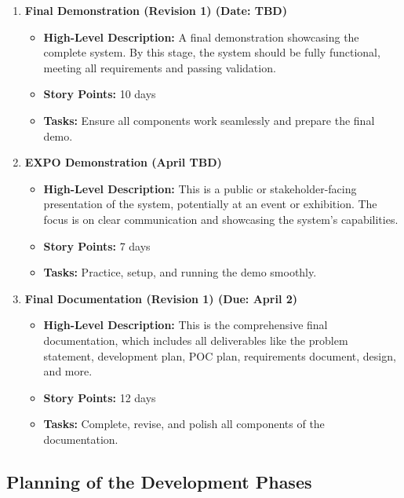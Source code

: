 \documentclass[12pt]{article}
\begin{document}
\begin{enumerate}
    \item \textbf{Final Demonstration (Revision 1) (Date: TBD)}
    \begin{itemize}
        \item \textbf{High-Level Description:} A final demonstration showcasing the complete system. By this stage, the system should be fully functional, meeting all requirements and passing validation.
        \item \textbf{Story Points:} 10 days
        \item \textbf{Tasks:} Ensure all components work seamlessly and prepare the final demo.
    \end{itemize}

    \item \textbf{EXPO Demonstration (April TBD)}
    \begin{itemize}
        \item \textbf{High-Level Description:} This is a public or stakeholder-facing presentation of the system, potentially at an event or exhibition. The focus is on clear communication and showcasing the system’s capabilities.
        \item \textbf{Story Points:} 7 days
        \item \textbf{Tasks:} Practice, setup, and running the demo smoothly.
    \end{itemize}

    \item \textbf{Final Documentation (Revision 1) (Due: April 2)}
    \begin{itemize}
        \item \textbf{High-Level Description:} This is the comprehensive final documentation, which includes all deliverables like the problem statement, development plan, POC plan, requirements document, design, and more.
        \item \textbf{Story Points:} 12 days
        \item \textbf{Tasks:} Complete, revise, and polish all components of the documentation.
    \end{itemize}

\end{enumerate}
\subsection{Planning of the Development Phases}
\end{document}
